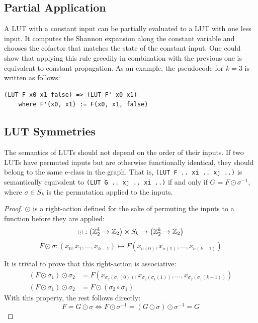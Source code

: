 \subsection{Partial Application}\label{sec:rewrites:application}
A LUT with a constant input can be partially evaluated to a LUT with one less
input. It computes the Shannon expansion along the constant variable and
chooses the cofactor that matches the state of the constant input. One could
show that applying this rule greedily in combination with the previous one is
equivalent to constant propagation. As an example, the pseudocode for $k=3$ is
written as follows:

\begin{lstlisting}
(LUT F x0 x1 false) => (LUT F' x0 x1)
    where F'(x0, x1) := F(x0, x1, false)
\end{lstlisting}

\subsection{LUT Symmetries}\label{sec:rewrites:symmetry}

The semantics of LUTs should not depend on the order of their inputs. If two
LUTs have permuted inputs but are otherwise functionally identical, they should
belong to the same e-class in the graph. That is, \mbox{\texttt{(LUT F .. xi ..
        xj ..)}} is semantically equivalent to \mbox{\texttt{(LUT G .. xj .. xi ..)}}
if and only if $G = F \odot \sigma^{-1}$, where $\sigma \in S_k$ is the
permutation applied to the inputs.

\begin{proof}
    $\odot$ is a right-action defined for the sake of permuting the inputs to a function before they are applied:
    \begin{equation*} \odot : \big (\mathbb{Z}_{2}^{k} \rightarrow \mathbb{Z}_2 \big ) \times S_k \rightarrow \big (\mathbb{Z}_{2}^{k} \rightarrow \mathbb{Z}_2 \big ) \end{equation*}
    \begin{equation*} F \odot \sigma : (x_0, x_1, \ldots, x_{k-1}) \mapsto F(x_{\sigma(0)}, x_{\sigma(1)}, \ldots, x_{\sigma(k-1)}) \end{equation*}

    It is trivial to prove that this right-action is associative:
    \begin{align*}
        (F \odot \sigma_1) \odot \sigma_2 & = F(x_{\sigma_2(\sigma_1(0))}, x_{\sigma_2(\sigma_1(1))}, \ldots, x_{\sigma_2(\sigma_1(k-1))}) \\
        (F \odot \sigma_1) \odot \sigma_2 & = F \odot (\sigma_2 \circ \sigma_1)
    \end{align*}
    With this property, the rest follows directly:
    \begin{equation}
        F = G \odot
        \sigma \iff F \odot \sigma^{-1} = (G \odot \sigma) \odot \sigma^{-1} = G
    \end{equation}
\end{proof}

